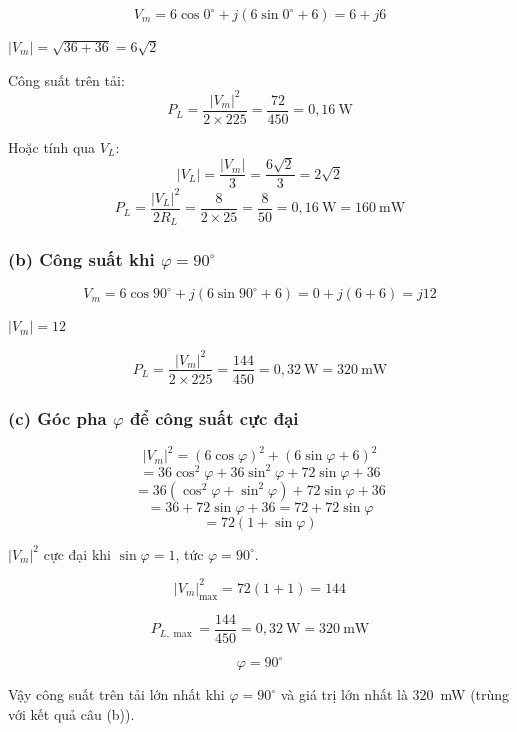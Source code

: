 \documentclass[12pt,a4paper]{article}
\begin{document}
\[
V_m = 6\cos 0^\circ + j(6\sin 0^\circ + 6) = 6 + j6
\]

$|V_m| = \sqrt{36 + 36} = 6\sqrt{2}$

Công suất trên tải:
\[
P_L = \frac{|V_m|^2}{2 \times 225} = \frac{72}{450} = 0{,}16~\text{W}
\]

Hoặc tính qua $V_L$:
\[
|V_L| = \frac{|V_m|}{3} = \frac{6\sqrt{2}}{3} = 2\sqrt{2}
\]
\[
P_L = \frac{|V_L|^2}{2 R_L} = \frac{8}{2 \times 25} = \frac{8}{50} = \boxed{0{,}16~\text{W} = 160~\text{mW}}
\]

\subsubsection{(b) Công suất khi $\varphi = 90^\circ$}

\[
V_m = 6\cos 90^\circ + j(6\sin 90^\circ + 6) = 0 + j(6 + 6) = j12
\]

$|V_m| = 12$

\[
P_L = \frac{|V_m|^2}{2 \times 225} = \frac{144}{450} = \boxed{0{,}32~\text{W} = 320~\text{mW}}
\]

\subsubsection{(c) Góc pha $\varphi$ để công suất cực đại}

\[
|V_m|^2 = (6\cos\varphi)^2 + (6\sin\varphi + 6)^2
\]
\[
= 36\cos^2\varphi + 36\sin^2\varphi + 72\sin\varphi + 36
\]
\[
= 36(\cos^2\varphi + \sin^2\varphi) + 72\sin\varphi + 36
\]
\[
= 36 + 72\sin\varphi + 36 = 72 + 72\sin\varphi
\]
\[
= 72(1 + \sin\varphi)
\]

$|V_m|^2$ cực đại khi $\sin\varphi = 1$, tức $\varphi = 90^\circ$.

\[
|V_m|^2_{\max} = 72(1 + 1) = 144
\]

\[
P_{L,\max} = \frac{144}{450} = \boxed{0{,}32~\text{W} = 320~\text{mW}}
\]

\[
\boxed{\varphi = 90^\circ}
\]

Vậy công suất trên tải lớn nhất khi $\varphi = 90^\circ$ và giá trị lớn nhất là $320$~mW (trùng với kết quả câu (b)).
\end{document}
